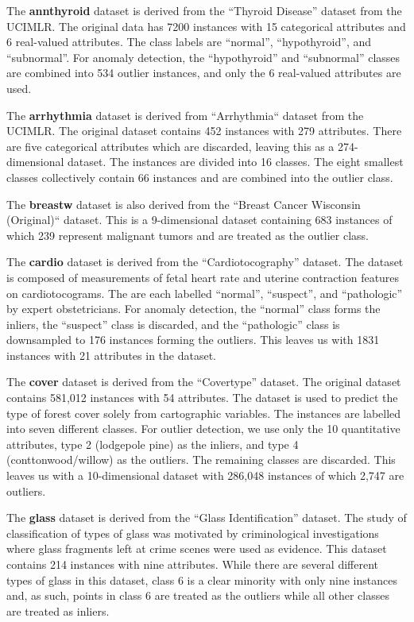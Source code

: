 The \textbf{annthyroid} dataset is derived from the ``Thyroid Disease'' dataset from the UCIMLR\@.
The original data has 7200 instances with 15 categorical attributes and 6 real-valued attributes.
The class labels are ``normal'', ``hypothyroid'', and ``subnormal''.
For anomaly detection, the ``hypothyroid'' and ``subnormal'' classes are combined into 534 outlier instances, and only the 6 real-valued attributes are used.

The \textbf{arrhythmia} dataset is derived from ``Arrhythmia`` dataset from the UCIMLR\@.
The original dataset contains 452 instances with 279 attributes.
There are five categorical attributes which are discarded, leaving this as a 274-dimensional dataset.
The instances are divided into 16 classes.
The eight smallest classes collectively contain 66 instances and are combined into the outlier class.

The \textbf{breastw} dataset is also derived from the ``Breast Cancer Wisconsin (Original)`` dataset.
This is a 9-dimensional dataset containing 683 instances of which 239 represent malignant tumors and are treated as the outlier class.

The \textbf{cardio} dataset is derived from the ``Cardiotocography'' dataset.
The dataset is composed of measurements of fetal heart rate and uterine contraction features on cardiotocograms.
The are each labelled ``normal'', ``suspect'', and ``pathologic'' by expert obstetricians.
For anomaly detection, the ``normal'' class forms the inliers, the ``suspect'' class is discarded, and the ``pathologic'' class is downsampled to 176 instances forming the outliers.
This leaves us with 1831 instances with 21 attributes in the dataset.

The \textbf{cover} dataset is derived from the ``Covertype'' dataset.
The original dataset contains 581,012 instances with 54 attributes.
The dataset is used to predict the type of forest cover solely from cartographic variables.
The instances are labelled into seven different classes.
For outlier detection, we use only the 10 quantitative attributes, type 2 (lodgepole pine) as the inliers, and type 4 (conttonwood/willow) as the outliers.
The remaining classes are discarded.
This leaves us with a 10-dimensional dataset with 286,048 instances of which 2,747 are outliers.

The \textbf{glass} dataset is derived from the ``Glass Identification'' dataset.
The study of classification of types of glass was motivated by criminological investigations where glass fragments left at crime scenes were used as evidence.
This dataset contains 214 instances with nine attributes.
While there are several different types of glass in this dataset, class 6 is a clear minority with only nine instances and, as such, points in class 6 are treated as the outliers while all other classes are treated as inliers.

